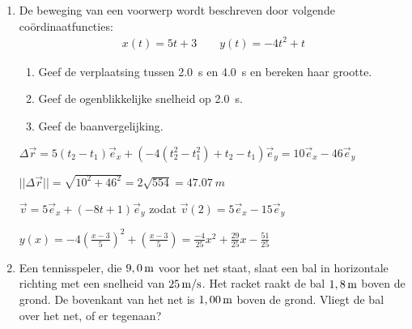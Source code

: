 \documentclass{ximera}
\begin{document}
\begin{enumerate}

	





\item De beweging van een voorwerp wordt beschreven door volgende co\"ordinaatfuncties:
\begin{eqnarray*}
	x(t)=5t+3\qquad y(t)=-4t^2+t
\end{eqnarray*}
\begin{enumerate}
\item Geef de verplaatsing tussen \SI{2,0}{s} en \SI{4,0}{s} en bereken haar grootte.
\item Geef de ogenblikkelijke snelheid op \SI{2,0}{s}.
\item Geef de baanvergelijking.
\end{enumerate}

\begin{oplossing}
$\Delta\vec{r}=5(t_2-t_1)\vec{e}_x+(-4(t_2^2-t_1^2)+t_2-t_1)\vec{e}_y=10\vec{e}_x-46\vec{e}_y$

$||\Delta\vec{r}||=\sqrt{10^2+46^2}=2\sqrt{554}=\SI{47,07}{m}$

$\vec{v}=5\vec{e}_x+(-8t+1)\vec{e}_y$ zodat $\vec{v}(2)=5\vec{e}_x-15\vec{e}_y$

$y(x)=-4\left(\frac{x-3}{5}\right)^2+\left(\frac{x-3}{5}\right)=\frac{-4}{25}x^{2} + \frac{29}{25}x - \frac{51}{25}$

\end{oplossing}




\item Een tennisspeler, die $9,0\rm\,m$ voor het net staat, slaat
een bal in horizontale richting met een snelheid van $25\rm\,m/s$.
Het racket raakt de bal $1,8\rm\,m$ boven de grond. De bovenkant van
het net is $1,00\rm\,m$ boven de grond. Vliegt de bal over het net,
of er tegenaan?




\end{enumerate}
\end{document}
